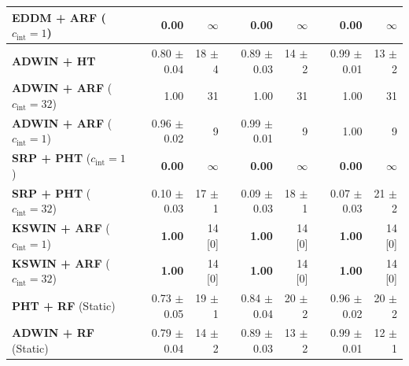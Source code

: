 \begin{table}[t]
\begin{tabular}{@{}lrrrrrr@{}}
    \textbf{EDDM + ARF} ($c_{\mathrm{int}} = 1$)   & \textbf{0.00}                             & $\infty$                                        & \textbf{0.00}                                    & $\infty$           & \textbf{0.00}           & $\infty$           \\
    \midrule
    \textbf{ADWIN + HT}                            & 0.80 {\small $\pm$0.04}                   & 18 {\small $\pm$4}                              & 0.89 {\small $\pm$0.03}                          & 14 {\small $\pm$2} & 0.99 {\small $\pm$0.01} & 13 {\small $\pm$2} \\
    \textbf{ADWIN + ARF} ($c_{\mathrm{int}} = 32$) & 1.00                                      & 31                                              & 1.00                                             & 31                 & 1.00                    & 31                 \\
    \textbf{ADWIN + ARF} ($c_{\mathrm{int}} = 1$)  & 0.96 {\small $\pm$0.02}                   & 9                                               & 0.99 {\small $\pm$0.01}                          & 9                  & 1.00                    & 9                  \\
    \midrule
    \textbf{SRP + PHT} ($c_{\mathrm{int}} = 1$)    & \textbf{0.00}                             & $\infty$                                        & \textbf{0.00}                                    & $\infty$           & \textbf{0.00}           & $\infty$           \\
    \textbf{SRP + PHT} ($c_{\mathrm{int}} = 32$)   & 0.10 {\small $\pm$0.03}                   & 17 {\small $\pm$1}                              & 0.09 {\small $\pm$0.03}                          & 18 {\small $\pm$1} & 0.07 {\small $\pm$0.03} & 21 {\small $\pm$2} \\
    \textbf{KSWIN + ARF} ($c_{\mathrm{int}} = 1$)  & \textbf{1.00}                             & 14 [0]                                          & \textbf{1.00}                                    & 14 [0]             & \textbf{1.00}           & 14 [0]             \\
    \textbf{KSWIN + ARF} ($c_{\mathrm{int}} = 32$) & \textbf{1.00}                             & 14 [0]                                          & \textbf{1.00}                                    & 14 [0]             & \textbf{1.00}           & 14 [0]             \\
    \midrule
    \textbf{PHT + RF} (Static)                     & 0.73 {\small $\pm$0.05}                   & 19 {\small $\pm$1}                              & 0.84 {\small $\pm$0.04}                          & 20 {\small $\pm$2} & 0.96 {\small $\pm$0.02} & 20 {\small $\pm$2} \\
    \textbf{ADWIN + RF} (Static)                   & 0.79 {\small $\pm$0.04}                   & 14 {\small $\pm$2}                              & 0.89 {\small $\pm$0.03}                          & 13 {\small $\pm$2} & 0.99 {\small $\pm$0.01} & 12 {\small $\pm$1} \\
    \bottomrule
  \end{tabular}
\end{table}
